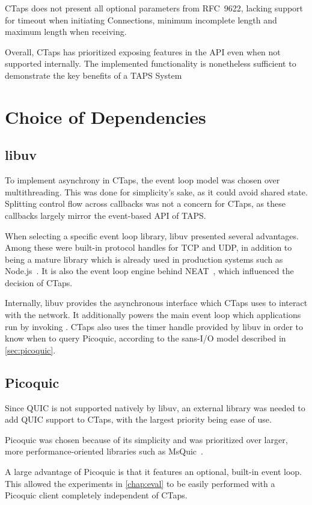 CTaps does not present all optional parameters from RFC~9622,
lacking support for timeout when initiating Connections,
minimum incomplete length and maximum length when receiving.

Overall, CTaps has prioritized exposing features in the API even
when not supported internally. The implemented functionality is
nonetheless sufficient to demonstrate the key benefits of a TAPS System

\section{Choice of Dependencies}
\subsection{libuv} \label{sec:dependency-libuv}
To implement asynchrony in CTaps, the event loop model was chosen over multithreading.
This was done for simplicity's sake, as it could avoid shared state.
Splitting control flow across callbacks was not a concern for CTaps, as
these callbacks largely mirror the event-based API of TAPS.

When selecting a specific event loop library, libuv presented
several advantages. Among these were built-in protocol handles for TCP
and UDP, in addition to being a mature library which is already
used in production systems such as Node.js~\cite{nodejsEventLoop}.
It is also the event loop engine behind
NEAT~\cite{neatCode}, which influenced the decision of CTaps.

Internally, libuv provides the asynchronous interface
which CTaps uses to interact with the network. It additionally powers
the main event loop which applications run by
invoking .
CTaps also uses the timer handle provided by libuv in order to know when to query Picoquic,
according to the sans-I/O model described in \cref{sec:picoquic}.

\subsection{Picoquic}
Since QUIC is not supported natively by libuv, an external library
was needed to add QUIC support to CTaps, with the largest
priority being ease of use.

Picoquic was chosen because
of its simplicity and was
prioritized over larger, more performance-oriented libraries such as
MsQuic~\cite{MsQuic}.

A large advantage of Picoquic is that it features an optional, built-in
event loop. This allowed the experiments in \cref{chap:eval} to be easily performed with a Picoquic
client completely independent of CTaps.

